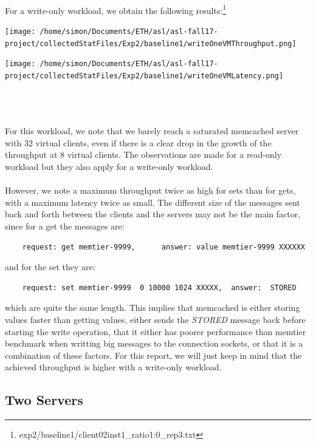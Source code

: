 \documentclass[11pt,a4paper]{article}
\begin{document}
\\
For a write-only workload, we obtain the following results:\footnote{exp2/baseline1/client02inst1\_ratio1:0\_rep3.txt}
\\
\begin{minipage}{0.5\linewidth}
\texttt{[image: /home/simon/Documents/ETH/asl/asl-fall17-project/collectedStatFiles/Exp2/baseline1/writeOneVMThroughput.png]}
\end{minipage}
\hfill
\begin{minipage}{0.5\linewidth}
\texttt{[image: /home/simon/Documents/ETH/asl/asl-fall17-project/collectedStatFiles/Exp2/baseline1/writeOneVMLatency.png]}
\end{minipage}
\\\\\\
For this workload, we note that we barely reach a saturated memcached server with 32 virtual clients, even if there is a clear drop in the growth of the throughput at 8 virtual clients. The observations are made for a read-only workload but they also apply for a write-only workload. 
\\\\
However, we note a maximum throughput twice as high for sets than for gets, with a maximum latency twice as small. The different size of the messages sent back and forth between the clients and the servers may not be the main factor, since for a get the messages are: 
\begin{lstlisting}
	request: get memtier-9999, 		answer: value memtier-9999 XXXXXX
\end{lstlisting}
and for the set they are:
\begin{lstlisting}
	request: set memtier-9999  0 10000 1024 XXXXX,	answer:  STORED
\end{lstlisting}
which are quite the same length. This implies that memcached is either storing values faster than getting values, either sends the \textit{STORED} message back before starting the write operation, that it either has poorer performance than memtier benchmark when writting big messages to the connection sockets, or that it is a combination of these factors. For this report, we will just keep in mind that the achieved throughput is higher with a write-only workload.
   
\subsection{Two Servers}
\end{document}
